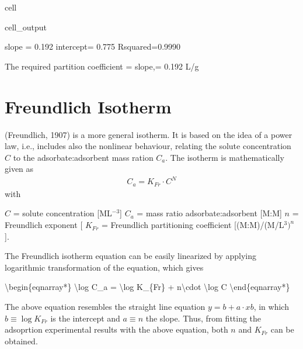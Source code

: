 \documentclass[letterpaper,10pt,english]{jupyterBook}
\begin{document}
\begin{sphinxuseclass}{cell}
\begin{sphinxVerbatimOutput}
\begin{sphinxuseclass}{cell_output}
\begin{sphinxVerbatim}[commandchars=\\\{\}]
slope = 0.192    intercept= 0.775  R\PYGZhy{}squared=0.9990 

The required partition coefficient = slope,= 0.192 L/g 
\end{sphinxVerbatim}

\noindent{}

\end{sphinxuseclass}\end{sphinxVerbatimOutput}

\end{sphinxuseclass}

\section{Freundlich Isotherm}
\label{\detokenize{content/transport/L10/22_reactive_transport:freundlich-isotherm}}
\sphinxAtStartPar
{} (Freundlich, 1907) is a more general isotherm. It is based on the idea of a power law, i.e., includes also the non\sphinxhyphen{}linear behaviour, relating the solute concentration \(C\) to the adsorbate:adsorbent mass ration \(C_a\). The isotherm is mathematically given as
\begin{equation*}
\begin{split}
C_a = K_{Fr} \cdot C^N
\end{split}
\end{equation*}
\sphinxAtStartPar
with

\sphinxAtStartPar
\(C\) = solute concentration {[}ML\(^{-3}\){]}
\(C_a\) = mass ratio adsorbate:adsorbent {[}M:M{]}
\(n\) = Freundlich exponent {[}\sphinxhyphen{}{]}
\(K_{Fr}\) = Freundlich partitioning coefficient {[}(M:M)/(M/L\(^3)^n\){]}.

\sphinxAtStartPar
The Freundlich isotherm equation can be easily linearized by applying logarithmic transformation of the equation, which gives

\sphinxAtStartPar
\textbackslash{}begin\{eqnarray*\}
\textbackslash{}log C\_a = \textbackslash{}log K\_\{Fr\} + n\textbackslash{}cdot \textbackslash{}log C
\textbackslash{}end\{eqnarray*\}

\sphinxAtStartPar
The above equation resembles the straight line equation \(y = b + a \cdot x b\), in which \(b\equiv \log K_{Fr}\) is the intercept and \(a\equiv n\) the slope. Thus, from fitting the adsoprtion experimental results with the above equation, both \(n\) and \(K_{Fr}\) can be obtained.
\end{document}
